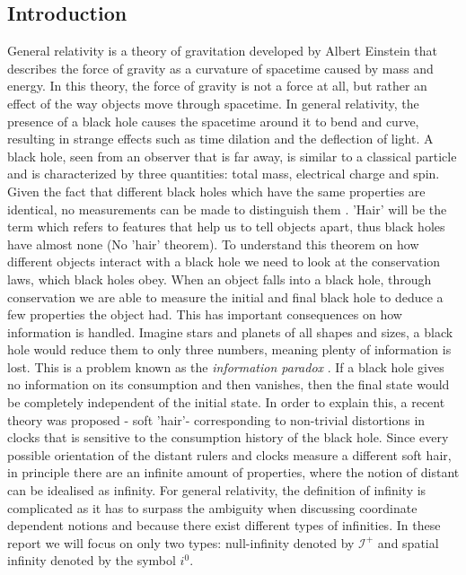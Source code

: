 \documentclass[
11pt, %
english, %
singlespacing, %
headsepline, %
]{MastersDoctoralThesis} %
\begin{document}
\begin{justify}
\section{Introduction}
General relativity is a theory of gravitation developed by Albert
Einstein that describes the force of gravity as a curvature of
spacetime caused by mass and energy. In this theory, the force of
gravity is not a force at all, but rather an effect of the way objects
move through spacetime. In general relativity, the presence of a black
hole causes the spacetime around it to bend and curve, resulting in
strange effects such as time dilation and the deflection of light.  A
black hole, seen from an observer that is far away, is similar to a
classical particle and is characterized by three quantities: total
mass, electrical charge and spin. Given the fact that different black
holes which have the same properties are identical, no measurements
can be made to distinguish them \cite{HawMalStr16}.
'Hair' will be
the term which refers to features that help us to tell objects
apart, thus black holes have almost none (No 'hair' theorem). To
understand this theorem on how different objects interact with a black
hole we need to look at the conservation laws, which black holes
obey. When an object falls into a black hole, through conservation we
are able to measure the initial and final black hole to deduce a few
properties the object had. This has important consequences on how
information is handled. Imagine stars and planets of all shapes and
sizes, a black hole would reduce them to only three numbers, meaning
plenty of information is lost. This is a problem known as the
\textit{information paradox} \cite{HawMalStr16}. If a black hole gives
no information on its consumption and then vanishes, then the final
state would be completely independent of the initial state.
In order
to explain this, a recent theory was proposed - soft 'hair'-
corresponding to non-trivial distortions in clocks that is sensitive
to the consumption history of the black hole. Since every possible
orientation of the distant rulers and clocks measure a different soft
hair, in principle there are an infinite amount of properties, where
the notion of distant can be idealised as infinity.
For general relativity, the definition of infinity is complicated as it has to
surpass the ambiguity when discussing coordinate dependent notions and
because there exist different types of infinities. In these report we
will focus on only two types: null-infinity denoted by $\mathscr{I}^+$
and spatial infinity denoted by the symbol $i^0$.
\end{justify}
\end{document}
